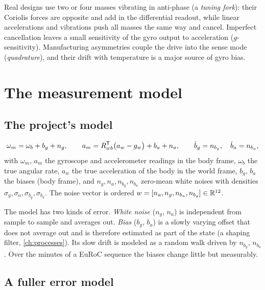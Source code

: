 Real designs use two or four masses vibrating in anti-phase (a \emph{tuning fork}): their Coriolis forces are opposite and add in the differential
readout, while linear accelerations and vibrations push all masses the same way and cancel. Imperfect cancellation leaves a small sensitivity of the
gyro output to acceleration ($g$-sensitivity). Manufacturing asymmetries couple the drive into the sense mode (\emph{quadrature}), and their drift with
temperature is a major source of gyro bias.

\section{The measurement model}

\subsection{The project's model}

\begin{convention}
\begin{equation}
  \omega_m = \omega_b + b_g + n_g, \qquad
  a_m = R_{wb}^{\mathsf{T}}\big(a_w - g_w\big) + b_a + n_a, \qquad
  \dot b_g = n_{b_g}, \quad \dot b_a = n_{b_a},
  \label{eq:imu-model}
\end{equation}
with $\omega_m$, $a_m$ the gyroscope and accelerometer readings in the body frame, $\omega_b$ the true angular rate, $a_w$ the true acceleration of the body in the
world frame, $b_g$, $b_a$ the biases (body frame), and $n_g, n_a, n_{b_g}, n_{b_a}$ zero-mean white noises with densities $\sigma_g, \sigma_a, \sigma_{b_g}, \sigma_{b_a}$. The
noise vector is ordered $w = [n_a, n_g, n_{b_a}, n_{b_g}] \in \mathbb{R}^{12}$.
\end{convention}

The model has two kinds of error. \emph{White noise} ($n_g$, $n_a$) is independent from sample to sample and averages out. \emph{Bias} ($b_g$, $b_a$) is a slowly
varying offset that does not average out and is therefore estimated as part of the state (a shaping filter, \cref{ch:processes}). Its slow drift is
modeled as a random walk driven by $n_{b_g}$, $n_{b_a}$. Over the minutes of a EuRoC sequence the biases change little but measurably.

\subsection{A fuller error model}

